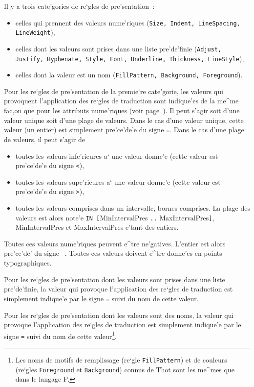 {Il y a trois cate'gories de re`gles de pre'sentation~:
\begin{itemize}
\item
celles qui prennent des valeurs nume'riques ({\tt Size, Indent, LineSpacing, LineWeight}),
\item
celles dont les valeurs sont prises dans une liste pre'de'finie ({\tt Adjust,
Justify, Hyphenate, Style, Font, Underline, Thickness, LineStyle}),
\item
celles dont la valeur est un nom ({\tt FillPattern, Background, Foreground}).
\end{itemize}

Pour les re`gles de pre'sentation de la premie`re cate'gorie, les valeurs
qui provoquent l'application des re`gles de traduction  sont indique'es
de la me^me fac,on que pour les attributs nume'riques (voir
page~\pageref{relatattr}). Il peut s'agir soit d'une valeur unique soit
d'une plage de valeurs. Dans le cas d'une valeur unique, cette valeur
(un entier) est simplement pre'ce'de'e du signe {\tt =}. Dans le cas
d'une plage de valeurs, il peut s'agir de
\begin{itemize}
\item
toutes les valeurs infe'rieures a` une valeur donne'e (cette valeur est
pre'ce'de'e du signe {\tt <}),
\item
toutes les valeurs supe'rieures a` une valeur donne'e (cette valeur est
pre'ce'de'e du signe {\tt >}),
\item
toutes les valeurs comprises dans un intervalle, bornes comprises. La plage
des valeurs est alors note'e {\tt IN [}MinIntervalPres {\tt ..}
MaxIntervalPres{\tt]}, MinIntervalPres et MaxIntervalPres e'tant des entiers.
\end{itemize}
Toutes ces valeurs nume'riques peuvent e^tre ne'gatives. L'entier est alors
pre'ce'de' du signe {\tt -}. Toutes ces valeurs doivent e^tre donne'es
en points typographiques.

Pour les re`gles de pre'sentation dont les valeurs sont prises dans une
liste pre'de'finie, la valeur qui provoque l'application des re`gles de
traduction est simplement indique'e par le signe {\tt =} suivi du nom de
cette valeur.

Pour les re`gles de pre'sentation dont les valeurs sont des noms,
la valeur qui provoque l'application des re`gles de traduction est
simplement indique'e par le signe {\tt =} suivi du nom de cette
valeur\footnote{Les noms de motifs de remplissage
(re`gle {\tt FillPattern}) et de couleurs (re`gles {\tt Foreground} et
{\tt Background}) connus de Thot sont les me^mes que dans le langage P.}.

}
